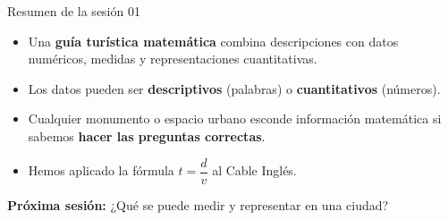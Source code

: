 \documentclass[aspectratio=169, 10pt, spanish]{beamer}
\begin{document}
\begin{frame}{Resumen de la sesión 01}
  \begin{resumenbox}
    \begin{itemize}
      \item Una \textbf{guía turística matemática} combina
            descripciones con datos numéricos, medidas y
            representaciones cuantitativas.
      \item Los datos pueden ser \textbf{descriptivos}
            (palabras) o \textbf{cuantitativos} (números).
      \item Cualquier monumento o espacio urbano esconde
            información matemática si sabemos \textbf{hacer
            las preguntas correctas}.
      \item Hemos aplicado la fórmula
            $t = \dfrac{d}{v}$ al Cable Inglés.
    \end{itemize}
  \end{resumenbox}
  
  \begin{center}
    {\color{AlmAzulM}
    \faArrowCircleRight\enskip
    \textbf{Próxima sesión:}
    ¿Qué se puede medir y representar en una ciudad?}
  \end{center}
\end{frame}
\end{document}
